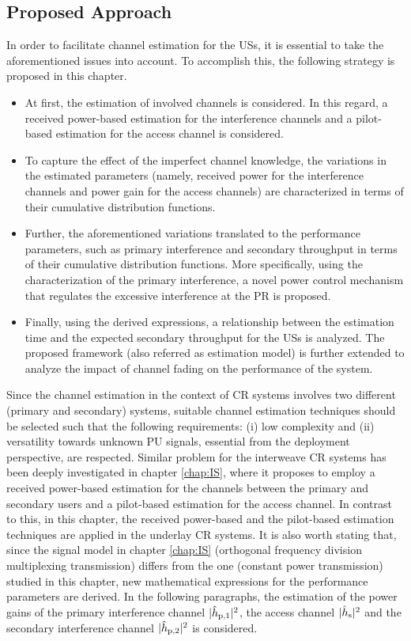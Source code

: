 \subsection{Proposed Approach} 
In order to facilitate channel estimation for the USs, it is essential to take the aforementioned issues into account. To accomplish this, the following strategy is proposed in this chapter.
\begin{itemize}
\item At first, the estimation of involved channels is considered. In this regard, a received power-based estimation for the interference channels and a pilot-based estimation for the access channel is considered. 
\item To capture the effect of the imperfect channel knowledge, the variations in the estimated parameters (namely, received power for the interference channels and power gain for the access channels) are characterized in terms of their cumulative distribution functions.
\item Further, the aforementioned variations translated to the performance parameters, such as primary interference and secondary throughput in terms of their cumulative distribution functions. More specifically, using the characterization of the primary interference, a novel power control mechanism that regulates the excessive interference at the PR is proposed.  
\item Finally, using the derived expressions, a relationship between the estimation time and the expected secondary throughput for the USs is analyzed. The proposed framework (also referred as estimation model) is further extended to analyze the impact of channel fading on the performance of the system. 
\end{itemize}
Since the channel estimation in the context of CR systems involves two different (primary and secondary) systems, suitable channel estimation techniques should be selected such that the following requirements: (i) low complexity and (ii) versatility towards unknown PU signals, essential from the deployment perspective, are respected. Similar problem for the interweave CR systems has been deeply investigated in chapter \ref{chap:IS}, where it proposes to employ a received power-based estimation for the channels between the primary and secondary users and a pilot-based estimation for the access channel. In contrast to this, in this chapter, the received power-based and the pilot-based estimation techniques are applied in the underlay CR systems. It is also worth stating that, since the signal model in chapter \ref{chap:IS} (orthogonal frequency division multiplexing transmission) differs from the one (constant power transmission) studied in this chapter, new mathematical expressions for the performance parameters are derived. 
In the following paragraphs, the estimation of the power gains of the primary interference channel $|\hat{h}_{\text{p,1}}|^2$, the access channel $|\hat{h}_{\text{s}}|^2$ and the secondary interference channel $|\hat{h}_{\text{p,2}}|^2$ is considered. 
